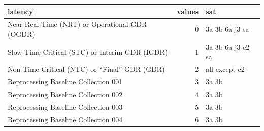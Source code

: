 \documentclass[a4paper,11pt,openany,natbib,nomargin]{thesis}
\makeatletter
\newcommand\var[1]{\url{#1}\index{variables!#1@\protect\url{#1}}}
\makeatother
\begin{document}
\begin{table}
\small
\begin{tabular}{lrl}
\hline
\var{latency} & values & sat \\
\hline
Near-Real Time (NRT) or Operational GDR (OGDR) & 0 & 3a 3b 6a j3 sa \\
Slow-Time Critical (STC) or Interim GDR (IGDR) & 1 & 3a 3b 6a j3 c2 sa \\
Non-Time Critical (NTC) or ``Final'' GDR (GDR) & 2 & all except c2 \\
Reprocessing Baseline Collection 001 & 3 & 3a 3b \\
Reprocessing Baseline Collection 002 & 4 & 3a 3b \\
Reprocessing Baseline Collection 003 & 5 & 3a 3b \\
Reprocessing Baseline Collection 004 & 6 & 3a 3b \\
\hline
\end{tabular}
\end{table}


\printindex
\end{document}
